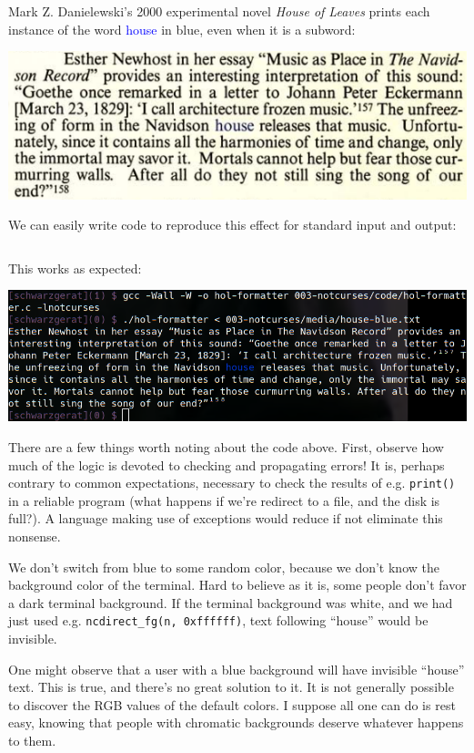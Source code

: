 \documentclass[letterpaper,10pt]{article}
\begin{document}
Mark Z. Danielewski's 2000 experimental novel \textit{House of Leaves} prints each 
instance of the word \textcolor{blue}{house} in blue, even when it is a subword:

\begin{center}
\includegraphics[width=.5\linewidth]{house-blue.png}
\end{center}

We can easily write code to reproduce this effect for standard input and output:

\begin{listing}[ht]
\inputminted{C}{code/hol-formatter.c}
\end{listing}

This works as expected:

\begin{center}
\includegraphics[width=.75\linewidth]{hol-formatted.png}
\end{center}

There are a few things worth noting about the code above. First, observe how
much of the logic is devoted to checking and propagating errors! It is, perhaps
contrary to common expectations, necessary to check the results of e.g.
\texttt{print()} in a reliable program (what happens if we're redirect to a file, and
the disk is full?). A language making use of exceptions would reduce if not
eliminate this nonsense.

We don't switch from blue to some random color, because we don't know the
background color of the terminal. Hard to believe as it is, some people don't
favor a dark terminal background. If the terminal background was white, and
we had just used e.g. \texttt{ncdirect\_fg(n, 0xffffff)}, text following ``house'' would
be invisible.

One might observe that a user with a blue background will have invisible ``house'' text.
This is true, and there's no great solution to it. It is not generally possible to
discover the RGB values of the default colors. I suppose all one can do is rest easy,
knowing that people with chromatic backgrounds deserve whatever happens to them.
\end{document}

